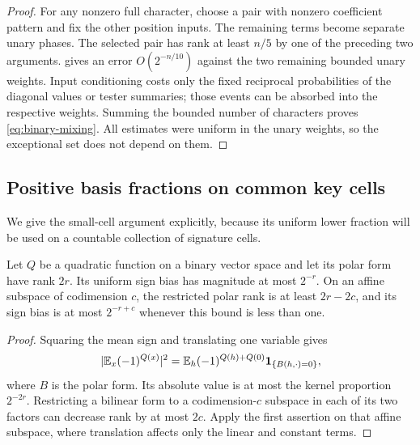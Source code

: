 \begin{proof}
For any nonzero full character, choose a pair with nonzero coefficient
pattern and fix the other position inputs. The remaining terms become
separate unary phases. The selected pair has rank at least $n/5$ by
one of the preceding two arguments.  gives an error
$O(2^{-n/10})$ against the two remaining bounded unary weights. Input
conditioning costs only the fixed reciprocal probabilities of the
diagonal values or tester summaries; those events can be absorbed
into the respective weights. Summing the bounded number of
characters proves \eqref{eq:binary-mixing}. All estimates were uniform
in the unary weights, so the exceptional set does not depend on them.
\end{proof}

\subsection{Positive basis fractions on common key cells}

We give the small-cell argument explicitly, because its uniform lower
fraction will be used on a countable collection of signature cells.

\begin{lemma}
\label{lem:histogram-quadratic-bias}
Let $Q$ be a quadratic function on a binary vector space and let its
polar form have rank $2r$. Its uniform sign bias has magnitude at
most $2^{-r}$. On an affine subspace of codimension $c$, the restricted
polar rank is at least $2r-2c$, and its sign bias is at most
$2^{-r+c}$ whenever this bound is less than one.
\end{lemma}

\begin{proof}
Squaring the mean sign and translating one variable gives
\[
 \lvert \mathbb E_x(-1)^{Q(x)}\rvert^2
 =\mathbb E_h(-1)^{Q(h)+Q(0)}\mathbf 1_{\{B(h,\cdot)=0\}},
\]
where $B$ is the polar form. Its absolute value is at most the kernel
proportion $2^{-2r}$. Restricting a bilinear form to a codimension-$c$
subspace in each of its two factors can decrease rank by at most
$2c$. Apply the first assertion on that affine subspace, where
translation affects only the linear and constant terms.
\end{proof}

